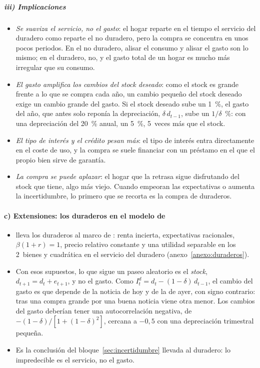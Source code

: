 \documentclass[11pt]{article}
\begin{document}
\subparagraph{iii) Implicaciones}

\begin{itemize}
\item \emph{Se suaviza el servicio, no el gasto}: el hogar reparte en el tiempo el servicio del duradero como reparte el no duradero, pero la compra se concentra en unos pocos periodos. En el no duradero, alisar el consumo y alisar el gasto son lo mismo; en el duradero, no, y el gasto total de un hogar es mucho más irregular que su consumo.
\item \emph{El gasto amplifica los cambios del stock deseado}: como el stock es grande frente a lo que se compra cada año, un cambio pequeño del stock deseado exige un cambio grande del gasto. Si el stock deseado sube un 1~\%, el gasto del año, que antes solo reponía la depreciación, $\delta\,d_{t-1}$, sube un $1/\delta$~\%: con una depreciación del 20~\% anual, un 5~\%, 5~veces más que el stock.
\item \emph{El tipo de interés y el crédito pesan más}: el tipo de interés entra directamente en el coste de uso, y la compra se suele financiar con un préstamo en el que el propio bien sirve de garantía.
\item \emph{La compra se puede aplazar}: el hogar que la retrasa sigue disfrutando del stock que tiene, algo más viejo. Cuando empeoran las expectativas o aumenta la incertidumbre, lo primero que se recorta es la compra de duraderos.
\end{itemize}

\paragraph{c) Extensiones: los duraderos en el modelo de }

\begin{itemize}
\item \textcite{Mankiw1982Hall} lleva los duraderos al marco de : renta incierta, expectativas racionales, $\beta(1+r)=1$, precio relativo constante y una utilidad separable en los 2~bienes y cuadrática en el servicio del duradero (anexo~\ref{anexo:duraderos}).
\item Con esos supuestos, lo que sigue un paseo aleatorio es el \emph{stock}, $d_{t+1}=d_t+e_{t+1}$, y no el gasto. Como $I^d_t=d_t-(1-\delta)\,d_{t-1}$, el cambio del gasto es
  que depende de la noticia de hoy y de la de ayer, con signo contrario: tras una compra grande por una buena noticia viene otra menor. Los cambios del gasto deberían tener una autocorrelación negativa, de $-(1-\delta)/[1+(1-\delta)^2]$, cercana a $-0{,}5$ con una depreciación trimestral pequeña.
\item Es la conclusión del bloque~\ref{sec:incertidumbre} llevada al duradero: lo impredecible es el servicio, no el gasto.
\end{itemize}
\end{document}
